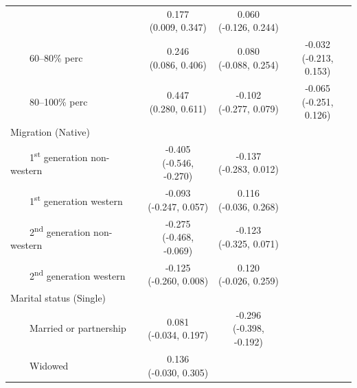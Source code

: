 \documentclass[12pt]{article}
\begin{document}
\begin{appendices}
\begin{longtable}{lccc}
                      & \makecell{ 0.177 \\ [-1ex] (0.009, 0.347) }
                      & \makecell{ 0.060 \\ [-1ex] (-0.126, 0.244) } \\ 
    ~~~~60--80\% perc & \makecell{ 0.246 \\ [-1ex] (0.086, 0.406) }
                      & \makecell{ 0.080 \\ [-1ex] (-0.088, 0.254) }
                      & \makecell{ -0.032 \\ [-1ex] (-0.213, 0.153) } \\ 
    ~~~~80--100\% perc & \makecell{ 0.447 \\ [-1ex] (0.280, 0.611) }
                       & \makecell{ -0.102 \\ [-1ex] (-0.277, 0.079) }
                       & \makecell{ -0.065 \\ [-1ex] (-0.251, 0.126) } \\ 
    Migration (Native) & & & \\
    ~~~~1\textsuperscript{st} generation non-western 
        & \makecell{ -0.405 \\ [-1ex] (-0.546, -0.270) }
        & \makecell{ -0.137 \\ [-1ex] (-0.283, 0.012) }
        &  \\ 
    ~~~~1\textsuperscript{st} generation western 
    	& \makecell{ -0.093 \\ [-1ex] (-0.247, 0.057) }
    	& \makecell{ 0.116 \\ [-1ex] (-0.036, 0.268) }
    	&  \\  
    ~~~~2\textsuperscript{nd} generation non-western 
    	& \makecell{ -0.275 \\ [-1ex] (-0.468, -0.069) }
    	& \makecell{ -0.123 \\ [-1ex] (-0.325, 0.071) }
    	&  \\  
    ~~~~2\textsuperscript{nd} generation western 
    	& \makecell{ -0.125 \\ [-1ex] (-0.260, 0.008) }
    	& \makecell{ 0.120 \\ [-1ex] (-0.026, 0.259) }
    	&  \\ 
    Marital status (Single) & & & \\
    ~~~~Married or partnership & \makecell{ 0.081 \\ [-1ex] (-0.034, 0.197) }
        & \makecell{ -0.296 \\ [-1ex] (-0.398, -0.192) }
        &  \\ 
    ~~~~Widowed & \makecell{ 0.136 \\ [-1ex] (-0.030, 0.305) }

\end{longtable}
\end{appendices}
\end{document}
